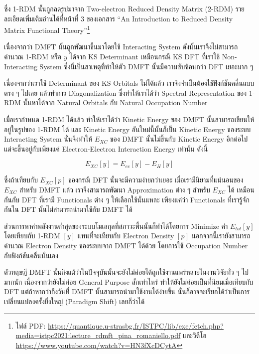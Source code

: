 ซึ่ง 1-RDM นั้นถูกลดรูปมาจาก Two-electron Reduced Density Matrix (2-RDM) รายละเอียดเพิ่มเติมอ่านได้ที่หน้าที่ 3 ของเอกสาร
\enquote{An Introduction to Reduced Density Matrix Functional Theory}\footnote{ไฟล์ PDF:
    \url{https://quantique.u-strasbg.fr/ISTPC/lib/exe/fetch.php?media=istpc2021:lecture_rdmft_pina_romaniello.pdf}
    และวิดีโอ \url{https://www.youtube.com/watch?v=HN3fXcDCytA}}

เนื่องจากว่า DMFT นั้นถูกพัฒนาขึ้นมาโดยใช้ Interacting System ดังนั้นเราจึงไม่สามารถคำนวณ 1-RDM หรือ $y$ ได้จาก KS Determinant
เหมือนกรณี KS DFT ที่เราใช้ Non-Interacting System ซึ่งนี่เป็นสาเหตุที่ทำให้ตัว DMFT นั้นมีความซับซ้อนกว่า DFT เยอะมาก ๆ

เนื่องจากว่าเราใช้ Determinant ของ KS Orbitals ไม่ได้แล้ว เราจึงจำเป็นต้องใช้ฟังก์ชันคลื่นแบบตรง ๆ ไปเลย แล้วทำการ Diagonalization
ซึ่งทำให้เราได้ว่า Spectral Representation ของ 1-RDM นั้นหาได้จาก Natural Orbitals กับ Natural Occupation Number

เมื่อเรากำหนด 1-RDM ได้แล้ว ทำให้เราได้ว่า Kinetic Energy ของ DMFT นั้นสามารถเขียนให้อยู่ในรูปของ 1-RDM ได้ และ Kinetic Energy
อันใหม่นี้นั้นก็เป็น Kinetic Energy ของระบบ Interacting System นั่นจึงทำให้ $E_{XC}$ ของ DMFT นั้นไม่ขึ้นกับ Kinetic Energy อีกต่อไป
แต่จะขึ้นอยู่กับเพียงแค่ Electron-Electron Interaction Energy เท่านั้น ดังนี้

\begin{equation}
    E_{XC}[y] = E_{ee}[y] - E_{H}[y]
\end{equation}

\noindent ซึ่งถ้าเทียบกับ $E_{XC}[p]$ ของกรณี DFT นั้นจะมีความง่ายกว่าเยอะ เมื่อเรามีนิยามที่แน่นอนของ $E_{XC}$ สำหรับ DMFT แล้ว
เราจึงสามารถพัฒนา Approximation ต่าง ๆ สำหรับ $E_{XC}$ ได้ เหมือนกันกับ DFT ที่เรามี Functionals ต่าง ๆ ให้เลือกใช้นั่นแหละ
เพียงแค่ว่า Functionals ที่เรารู้จักกันใน DFT นั้นไม่สามารถนำมาใช้กับ DMFT ได้

ส่วนการหาค่าพลังงานต่ำสุดของระบบโมเลกุลที่สภาวะพื้นนั้นก็ทำได้โดยการ Minimize ค่า $E_{tot}[y]$ โดยเทียบกับ 1-RDM $[y]$ แทนที่จะเทียบกับ
Electron Density $[p]$ นอกจากนี้เรายังสามารถคำนวณ Electron Density ของระบบจาก DMFT ได้ด้วย โดยการใช้ Occupation Number
กับฟังก์ชันคลื่นนั่นเอง

ตัวทฤษฎี DMFT นั้นถึงแม้ว่าในปัจจุบันนั้นจะยังไม่ค่อยได้ถูกใช้งานแพร่หลายในงานวิจัยทั่ว ๆ ไปมากนัก เนื่องจากว่ายังไม่ค่อย General Purpose
สักเท่าไหร่ ทำให้ยังไม่ค่อยเป็นที่นิยมเมื่อเทียบกับ DFT แต่ถ้าหากว่าถึงวันที่่ DMFT นั้นสามารถนำมาใช้งานได้ง่ายขึ้น นั่นก็อาจจะเรียกได้ว่าเป็นการ%
เปลี่ยนแปลงครั้งยิ่งใหญ่ (Paradigm Shift) เลยก็ว่าได้
